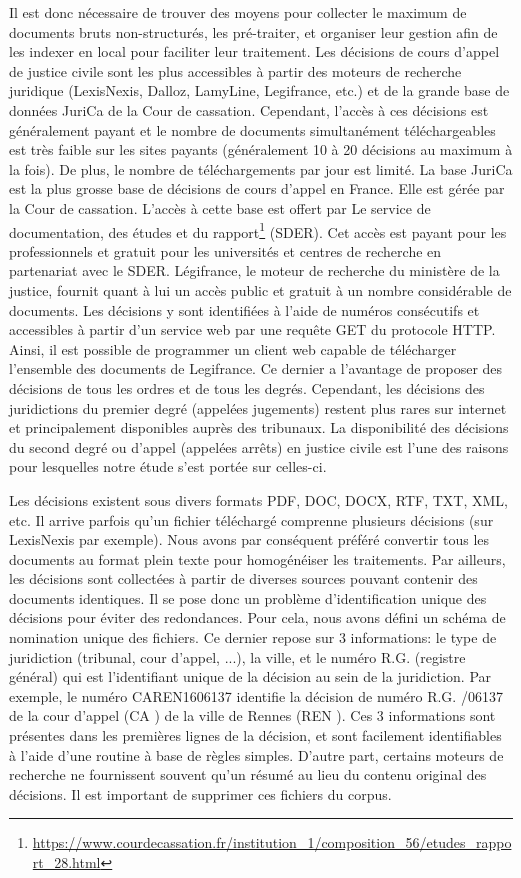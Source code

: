  Il est donc nécessaire de trouver des moyens pour collecter le maximum de documents bruts non-structurés, les pré-traiter, et organiser leur gestion afin de les indexer en local pour faciliter leur traitement. Les décisions de cours d'appel de justice civile sont les plus accessibles à partir des moteurs de recherche juridique (LexisNexis, Dalloz, LamyLine, Legifrance, etc.) et de la grande base de données JuriCa de la Cour de cassation. Cependant, l'accès à ces décisions est généralement payant et le nombre de documents simultanément téléchargeables est très faible sur les sites payants (généralement 10 à 20 décisions au maximum à la fois). De plus, le nombre de téléchargements par jour est limité. La base JuriCa est la plus grosse base de décisions de cours d'appel en France. Elle est gérée par la Cour de cassation. L'accès à cette base est offert par Le service de documentation, des études et du rapport\footnote{\url{https://www.courdecassation.fr/institution_1/composition_56/etudes_rapport_28.html}} (SDER). Cet accès est payant pour les professionnels et gratuit pour les universités et centres de recherche en partenariat avec le SDER. Légifrance, le moteur de recherche du ministère de la justice, fournit quant à lui un accès public et gratuit à un nombre considérable de documents. Les décisions y sont identifiées à l'aide de numéros consécutifs et accessibles à partir d'un service web par une requête GET du protocole HTTP. Ainsi, il est possible de programmer un client web capable de télécharger l'ensemble des documents de Legifrance. Ce dernier a l'avantage de proposer des décisions de tous les ordres et de tous les degrés. Cependant, les décisions des juridictions du premier degré (appelées jugements) restent plus rares sur internet et principalement disponibles auprès des tribunaux.  La disponibilité des décisions du second degré ou d'appel (appelées arrêts) en justice civile est l'une des raisons pour lesquelles notre étude s'est portée sur celles-ci.

Les décisions existent sous divers formats PDF, DOC, DOCX, RTF, TXT, XML, etc. Il arrive parfois qu'un fichier téléchargé comprenne plusieurs décisions (sur LexisNexis par exemple). Nous avons par conséquent préféré convertir tous les documents au format plein texte pour homogénéiser les traitements. Par ailleurs, les décisions sont collectées à partir de diverses sources pouvant contenir des documents identiques. Il se pose donc un problème d'identification unique des décisions pour éviter des redondances. Pour cela, nous avons défini un schéma de nomination unique des fichiers. Ce dernier repose sur 3 informations: le type de juridiction (tribunal, cour d'appel, ...), la ville, et le numéro R.G. (registre général) qui est l'identifiant unique de la décision au sein de la juridiction. Par exemple, le numéro \og CAREN1606137 \fg{} identifie la décision de numéro R.G. /06137 \fg{} de la cour d'appel (\og CA \fg{}) de la ville de Rennes (\og REN \fg{}). Ces 3 informations sont présentes dans les premières lignes de la décision, et sont facilement identifiables à l'aide d'une routine à base de règles simples. D'autre part, certains moteurs de recherche ne fournissent souvent qu'un résumé au lieu du contenu original des décisions. Il est important de supprimer ces fichiers du corpus.

